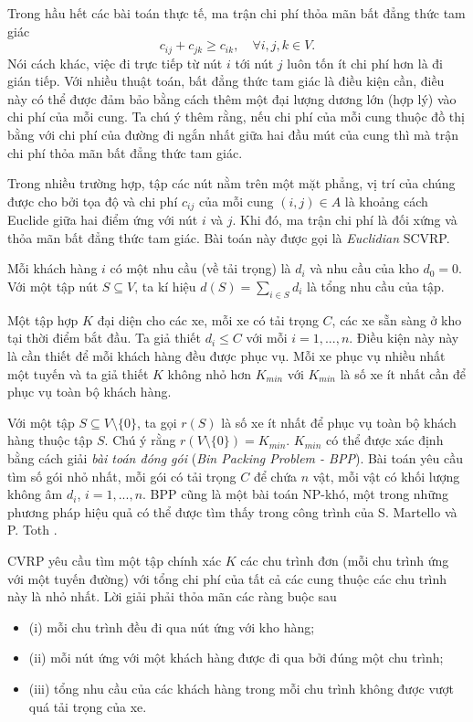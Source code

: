 Trong hầu hết các bài toán thực tế, ma trận chi phí thỏa mãn bất đẳng thức tam giác
\begin{equation}
	c_{ij} + c_{jk} \geq c_{ik}, \quad \forall i,j,k \in V.
\end{equation}
Nói cách khác, việc đi trực tiếp từ nút $i$ tới nút $j$ luôn tốn ít chi phí hơn là đi gián tiếp. Với nhiều thuật toán, bất đẳng thức tam giác là điều kiện cần, điều này có thể được đảm bảo bằng cách thêm một đại lượng dương lớn (hợp lý) vào chi phí của mỗi cung. Ta chú ý thêm rằng, nếu chi phí của mỗi cung thuộc đồ thị bằng với chi phí của đường đi ngắn nhất giữa hai đầu mút của cung thì mà trận chi phí thỏa mãn bất đẳng thức tam giác.

Trong nhiều trường hợp, tập các nút nằm trên một mặt phẳng, vị trí của chúng được cho bởi tọa độ và chi phí $c_{ij}$ của mỗi cung $(i,j) \in A$ là khoảng cách Euclide giữa hai điểm ứng với nút $i$ và $j$. Khi đó, ma trận chi phí là đối xứng và thỏa mãn bất đẳng thức tam giác. Bài toán này được gọi là \textit{Euclidian} SCVRP.

Mỗi khách hàng $i$ có một nhu cầu (về tải trọng) là $d_i$ và nhu cầu của kho $d_0=0$. Với một tập nút $S \subseteq V$, ta kí hiệu $d(S) = \sum_{i \in S} d_i$ là tổng nhu cầu của tập.

Một tập hợp $K$ đại diện cho các xe, mỗi xe có tải trọng $C$, các xe sẵn sàng ở kho tại thời điểm bắt đầu. Ta giả thiết $d_i \leq C$ với mỗi $i=1,...,n$. Điều kiện này này là cần thiết để  mỗi khách hàng đều được phục vụ. Mỗi xe phục vụ nhiều nhất một tuyến và ta giả thiết $K$ không nhỏ hơn $K_{min}$ với $K_{min}$ là số xe ít nhất cần để phục vụ toàn bộ khách hàng.

Với một tập $S \subseteq V \setminus \{0\}$, ta gọi $r(S)$ là số xe ít nhất để phục vụ toàn bộ khách hàng thuộc tập $S$. Chú ý rằng $r(V \setminus \{0\}) = K_{min}$. $K_{min}$ có thể được xác định bằng cách giải \textit{bài toán đóng gói} (\textit{Bin Packing Problem - BPP}). Bài toán yêu cầu tìm số gói nhỏ nhất, mỗi gói có tải trọng $C$ để chứa $n$ vật, mỗi vật có khối lượng không âm $d_i$, $i=1,...,n$. BPP cũng là một bài toán NP-khó, một trong những phương pháp hiệu quả có thể được tìm thấy trong công trình của S. Martello và P. Toth \cite{martello1990knapsack}.

CVRP yêu cầu tìm một tập chính xác $K$ các chu trình đơn (mỗi chu trình ứng với một tuyến đường) với tổng chi phí của tất cả các cung thuộc các chu trình này là nhỏ nhất. Lời giải phải thỏa mãn các ràng buộc sau
\begin{itemize}
	\item[] (i) mỗi chu trình đều đi qua nút ứng với kho hàng;
	\item[] (ii) mỗi nút ứng với một khách hàng được đi qua bởi đúng một chu trình;
	\item[] (iii) tổng nhu cầu của các khách hàng trong mỗi chu trình không được vượt quá tải trọng của xe.
\end{itemize}

